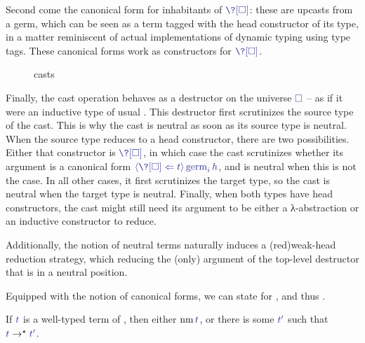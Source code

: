 Second come the canonical form for inhabitants of $\tcol{\?[\uni]}$:
these are upcasts from a germ, which can be seen as a term tagged
with the head constructor of its type, in a matter reminiscent of
actual implementations of dynamic typing using type tags.
These canonical forms work as constructors for $\tcol{\?[\uni]}$.

\begin{figure}[h]
  \ContinuedFloat
  \caption{ casts}
  \label{fig:ccic-cast-neu}
\end{figure}

Finally, the cast operation behaves as a destructor on the
universe $\tcol{\uni}$ – as if it were an inductive type of usual .
This destructor first scrutinizes the source type of the cast.
This is why the cast is neutral as soon as its source type is neutral.
When the source type reduces to a head constructor, there are two
possibilities. Either that constructor is $\tcol{\?[\uni]}$, in which case the cast
scrutinizes whether its argument is a canonical form
$\tcol{\cast{t}{\?[\uni]}{\stalkCIC{i}{h}}}$, and is neutral when this is not the case.
In all other cases, it first scrutinizes the target type,
so the cast is neutral when the target type is neutral.
Finally, when both types have head constructors, the cast
might still need its argument to be either a λ-abstraction or an inductive
constructor to reduce.

Additionally, the notion of neutral terms naturally induces a \kl(red){weak-head}
reduction strategy, which reducing the (only) argument of the
top-level destructor that is in a neutral position.

Equipped with the notion of canonical forms, we can state  for , and thus
.

\begin{theorem}
  \label{thm:ccic-progress}
  If $\tcol{t}$ is a well-typed term of ,
  then either $\nm \tcol{t}$, or there is some $\tcol{t'}$
  such that $\tcol{t} \red \tcol{t'}$.
\end{theorem}

